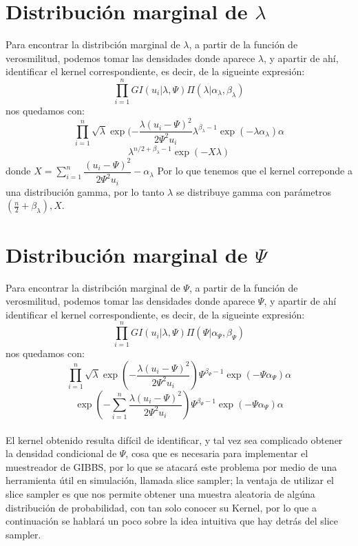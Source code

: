 \documentclass[11pt]{book}
\begin{document}
\section*{Distribución marginal de $\lambda$}
Para encontrar la distribción marginal de $\lambda$, a partir de la función de verosmilitud, podemos tomar las densidades donde aparece $\lambda$, y apartir de ahí, identificar el kernel correspondiente, es decir, de la sigueinte expresión:
\begin{equation*}
\prod_{i=1}^{n}GI(u_{i}|\lambda,\Psi)\Pi(\lambda|\alpha_{\lambda},\beta_{\lambda})
\end{equation*}
nos quedamos con:
\begin{equation*}
\prod_{i=1}^{n}\sqrt{\lambda}\exp(-\frac{\lambda(u_{i}-\Psi)^{2}}{2\Psi^{2}u_{i}}\lambda^{\beta_{\lambda}-1}\exp(-\lambda\alpha_{\lambda})\alpha
\end{equation*}
\begin{equation*}
\lambda^{n/2+\beta_{\lambda} -1}\exp(-X\lambda)
\end{equation*}
donde $X=\sum_{i=1}^{n}\dfrac{(u_{i}-\Psi)^{2}}{2\Psi^{2}u_{i}} - \alpha_{\lambda}$
Por lo que tenemos que el kernel correponde a una distribución gamma, por lo tanto $\lambda$ se distribuye gamma con parámetros $(\frac{n}{2}+\beta_{\lambda}),X$.

\section*{Distribución marginal de $\Psi$}
Para encontrar la distribción marginal de $\Psi$, a partir de la función de verosmilitud, podemos tomar las densidades donde aparece $\Psi$, y apartir de ahí identificar el kernel correspondiente, es decir, de la sigueinte expresión:
\begin{equation*}
	\prod_{i=1}^{n}GI(u_{i}|\lambda,\Psi)\Pi(\Psi|\alpha_{\Psi},\beta_{\Psi})
\end{equation*}
nos quedamos con:
\begin{equation*}
	\prod_{i=1}^{n}\sqrt{\lambda}\exp(-\frac{\lambda(u_{i}-\Psi)^{2}}{2\Psi^{2}u_{i}})\Psi^{\beta_{\Psi}-1}\exp(-\Psi\alpha_{\Psi}) \alpha
\end{equation*}
\begin{equation*}
\exp(-\sum_{i=1}^{n}\frac{\lambda(u_{i}-\Psi)^{2}}{2\Psi^{2}u_{i}})\Psi^{\beta_{\Psi}-1}\exp(-\Psi\alpha_{\Psi}) \alpha
\end{equation*}
\\
El kernel obtenido resulta difícil de identificar, y tal vez sea complicado obtener la densidad condicional  de $\Psi$, cosa que es necesaria para implementar el muestreador de GIBBS, por lo que se atacará este problema por medio de una herramienta útil en simulación, llamada slice sampler; la ventaja de utilizar el slice sampler es que nos permite obtener una muestra aleatoria de algúna distribución de probabilidad, con tan solo conocer su Kernel, por lo que a continuación se hablará un poco sobre la idea intuitiva que hay detrás del slice sampler.
\end{document}
